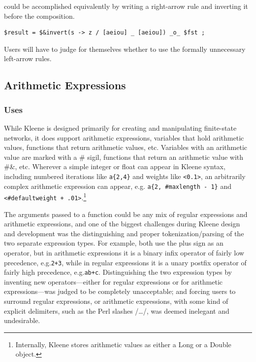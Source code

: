 \documentclass[letterpaper,12pt]{article}
\newcommand{\Kleene}{Kleene\xspace}
\begin{document}
\noindent
could be accomplished equivalently by writing a right-arrow rule
and inverting it before the composition.


\begin{Verbatim}[fontsize=\small]
$result = $&invert(s -> z / [aeiou] _ [aeiou]) _o_ $fst ;
\end{Verbatim}

\noindent 
Users will have to judge for themselves whether to use
the formally unnecessary left-arrow rules.


\subsection{Arithmetic Expressions}

\subsubsection{Uses}

While \Kleene{} is designed primarily for creating and manipulating
finite-state networks, it does support arithmetic expressions, variables
that hold arithmetic values, functions that return arithmetic values,
etc.  Variables with an arithmetic value are marked with a \# sigil,
functions that return an arithmetic value with \#\&, etc.  Wherever a
simple integer or float can appear in \Kleene{} syntax, including
numbered iterations like \verb!a{2,4}! and weights like \verb!<0.1>!, an
arbitrarily complex arithmetic expression can appear, e.g.\@ 
\verb!a{2, #maxlength - 1}! and \verb!<#defaultweight + .01>!.\footnote{Internally,
\Kleene{} stores arithmetic values as either a Long or a Double object.}

The arguments passed to a function could be any mix of regular
expressions and arithmetic expressions, and one of the biggest challenges
during \Kleene{} design and development was the distinguishing and proper
tokenization/parsing of the two separate expression types.  For example,
both use the plus sign as an operator, but in arithmetic expressions it
is a binary infix operator of fairly low precedence, e.g.\@  \verb!2+3!,
while in regular expressions it is a unary postfix operator of fairly
high precedence, e.g.\@ \verb!ab+c!.  Distinguishing the two
expression types by inventing new operators---either for regular
expressions or for arithmetic expressions---was judged to be
completely unacceptable; and forcing users to surround regular
expressions, or arithmetic expressions, with some kind of explicit
delimiters, such as the Perl slashes /\ldots/, was deemed inelegant
and undesirable.
\end{document}
